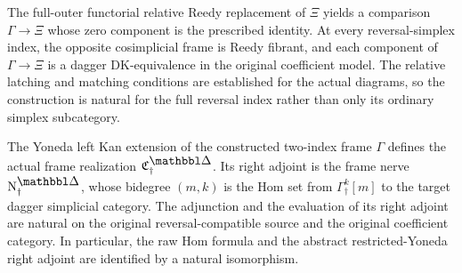 \begin{resultblock}
\begin{proposition}
\label{catalogue:F4}
The full-outer functorial relative Reedy replacement of $\Xi$ yields a comparison $\Gamma\to\Xi$ whose zero component is the prescribed identity.
At every reversal-simplex index, the opposite cosimplicial frame is Reedy fibrant, and each component of $\Gamma\to\Xi$ is a dagger DK-equivalence in the original coefficient model.
The relative latching and matching conditions are established for the actual diagrams, so the construction is natural for the full reversal index rather than only its ordinary simplex subcategory.
\end{proposition}

\end{resultblock}

\begin{resultblock}
\begin{proposition}
\label{catalogue:F5}
The Yoneda left Kan extension of the constructed two-index frame $\Gamma$ defines the actual frame realization $\frakC^{\prism}_{\dag}$.
Its right adjoint is the frame nerve $\N^{\prism}_{\dag}$, whose bidegree $(m,k)$ is the Hom set from $\Gamma^k_{\dag}[m]$ to the target dagger simplicial category.
The adjunction and the evaluation of its right adjoint are natural on the original reversal-compatible source and the original coefficient category.
In particular, the raw Hom formula and the abstract restricted-Yoneda right adjoint are identified by a natural isomorphism.
\end{proposition}

\end{resultblock}


